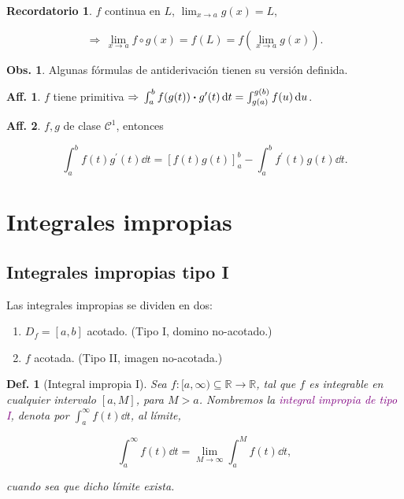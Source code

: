 \documentclass{article}
\theoremstyle{definicion}
\newtheorem{definicion}{Def.}
\theoremstyle{definition}             %
\theoremstyle{definition}             %
\theoremstyle{definition}
\newtheorem{record}{Recordatorio}
\theoremstyle{definition}
\theoremstyle{observacion}
\newtheorem{obs}{Obs.}
\theoremstyle{definition}
\theoremstyle{plain}
\theoremstyle{definition}
\theoremstyle{afirmacion}
\newtheorem{aff}{Aff.}
\theoremstyle{definition}
\begin{document}
    \begin{record}
        \(f\) continua en \(L\), \(\lim_{x\to a} g(x) = L\),

        \begin{equation*}
            \Rightarrow\, \lim_{x\to a} f \circ g (x) = f(L) = f(\lim_{x\to a}g(x)).
        \end{equation*}
    \end{record}

    \begin{obs}
        Algunas fórmulas de antiderivación tienen su versión definida.
    \end{obs}

    \begin{aff}
        \(f\) tiene primitiva \(\Rightarrow\, \int_{a}^{b}f(g(t))\vdot g^{\prime}(t)\dd{t} = \int_{g(a)}^{g(b)}f(u) \dd{u}\).
    \end{aff}

    \begin{aff}
        \(f,g\) de clase \(\mathscr{C}^{1}\), entonces 

        \begin{equation*}
            \int_{a}^{b}f(t)g^{\prime}(t)\dd{t} = [f(t)g(t)]_{a}^{b} - \int_{a}^{b}f^{\prime}(t)g(t)\dd{t}.
        \end{equation*}
    \end{aff}

    \section{Integrales impropias}

    \subsection{Integrales impropias tipo I}

    Las integrales impropias se dividen en dos:

    \begin{enumerate}
        \item \(D_{f} = [a,b]\) acotado. (Tipo I, domino no-acotado.)
        \item \(f\) acotada. (Tipo II, imagen no-acotada.)
    \end{enumerate}

    \begin{definicion}[Integral impropia I]
        Sea \(f\colon [a,\infty)\subseteq \mathbb{R}\to\mathbb{R}\), tal que \(f\) es integrable en cualquier intervalo \([a, M]\), para \(M > a\). Nombremos la \textcolor{purple}{integral impropia de tipo I}, denota por \(\int_{a}^{\infty}f(t)\dd{t}\), al límite,

        \begin{equation*}
            \int_{a}^{\infty}f(t)\dd{t} = \lim_{M \to \infty} \int_{a}^{M}f(t)\dd{t},
        \end{equation*}

        cuando sea que dicho límite exista.
    \end{definicion}
\end{document}
